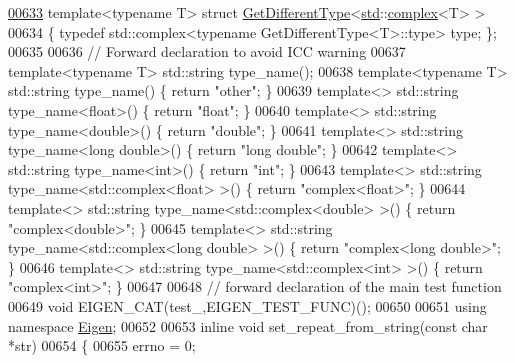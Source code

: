 \begin{DoxyCode}
\hyperlink{struct_get_different_type_3_01std_1_1complex_3_01_t_01_4_01_4}{00633} \textcolor{keyword}{template}<\textcolor{keyword}{typename} T> \textcolor{keyword}{struct }\hyperlink{struct_get_different_type}{GetDifferentType}<\hyperlink{namespacestd}{std}::\hyperlink{structcomplex}{complex}<T> >
00634 \{ \textcolor{keyword}{typedef} std::complex<typename GetDifferentType<T>::type> type; \};
00635 
00636 \textcolor{comment}{// Forward declaration to avoid ICC warning}
00637 \textcolor{keyword}{template}<\textcolor{keyword}{typename} T> std::string type\_name();
00638 \textcolor{keyword}{template}<\textcolor{keyword}{typename} T> std::string type\_name()                    \{ \textcolor{keywordflow}{return} \textcolor{stringliteral}{"other"}; \}
00639 \textcolor{keyword}{template}<> std::string type\_name<float>()                       \{ \textcolor{keywordflow}{return} \textcolor{stringliteral}{"float"}; \}
00640 \textcolor{keyword}{template}<> std::string type\_name<double>()                      \{ \textcolor{keywordflow}{return} \textcolor{stringliteral}{"double"}; \}
00641 \textcolor{keyword}{template}<> std::string type\_name<long double>()                 \{ \textcolor{keywordflow}{return} \textcolor{stringliteral}{"long double"}; \}
00642 \textcolor{keyword}{template}<> std::string type\_name<int>()                         \{ \textcolor{keywordflow}{return} \textcolor{stringliteral}{"int"}; \}
00643 \textcolor{keyword}{template}<> std::string type\_name<std::complex<float> >()        \{ \textcolor{keywordflow}{return} \textcolor{stringliteral}{"complex<float>"}; \}
00644 \textcolor{keyword}{template}<> std::string type\_name<std::complex<double> >()       \{ \textcolor{keywordflow}{return} \textcolor{stringliteral}{"complex<double>"}; \}
00645 \textcolor{keyword}{template}<> std::string type\_name<std::complex<long double> >()  \{ \textcolor{keywordflow}{return} \textcolor{stringliteral}{"complex<long double>"}; \}
00646 \textcolor{keyword}{template}<> std::string type\_name<std::complex<int> >()          \{ \textcolor{keywordflow}{return} \textcolor{stringliteral}{"complex<int>"}; \}
00647 
00648 \textcolor{comment}{// forward declaration of the main test function}
00649 \textcolor{keywordtype}{void} EIGEN\_CAT(test\_,EIGEN\_TEST\_FUNC)();
00650 
00651 \textcolor{keyword}{using namespace }\hyperlink{namespace_eigen}{Eigen};
00652 
00653 \textcolor{keyword}{inline} \textcolor{keywordtype}{void} set\_repeat\_from\_string(\textcolor{keyword}{const} \textcolor{keywordtype}{char} *str)
00654 \{
00655   errno = 0;

\end{DoxyCode}
